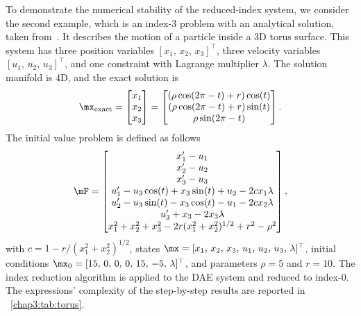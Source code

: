 To demonstrate the numerical stability of the reduced-index system, we consider the second example, which is an index-3 problem with an analytical solution, taken from~\cite{campbell1995constraint}. It describes the motion of a particle inside a 3D torus surface. This system has three position variables $[x_{1}, \, x_{2}, \, x_{3}]^\top$, three velocity variables $[u_{1}, \, u_{2}, \, u_{3}]^\top$, and one constraint with Lagrange multiplier $\lambda$. The solution manifold is 4D, and the exact solution is
%
\begin{equation}
  \label{chap3:eq:torus_solution}
  \mx_\text{exact} = \begin{bmatrix}
    x_{1} \\ x_{2} \\ x_{3}
  \end{bmatrix} = \begin{bmatrix}
    (\rho \cos(2\pi - t) + r) \cos(t) \\
    (\rho \cos(2\pi - t) + r) \sin(t) \\
    \rho \sin(2\pi - t)
  \end{bmatrix}.
\end{equation}
%
The initial value problem is defined as follows
%
\begin{equation}
  \label{chap3:eq:torus}
  \mF = \begin{bmatrix}
    x^{\prime}_{1} - u_{1} \\
    x^{\prime}_{2} - u_{2} \\
    x^{\prime}_{3} - u_{3} \\
    u^{\prime}_{1} - u_{3}\cos(t) + x_{3}\sin(t) + u_{2} - 2 c x_{1}\lambda \\
    u^{\prime}_{2} - u_{3}\sin(t) - x_{3}\cos(t) - u_{1} - 2 c x_{2}\lambda \\
    u^{\prime}_{3} + x_{3} - 2x_{3}\lambda \\
    x_{1}^2 + x_{2}^2 + x_{3}^2 - 2r(x_{1}^2 + x_{2}^2)^{1/2} + r^2 - \rho^2
  \end{bmatrix},
\end{equation}
%
with $c = 1 - {r} / {(x_{1}^2 + x_{2}^2)^{1/2}}$, states $\mx = [x_{1}, \, x_{2}, \, x_{3}, \, u_{1}, \, u_{2}, \, u_{3}, \, \lambda]^{\top}$, initial conditions $\mx_{0} = [15, \, 0, \, 0, \, 0, \, 15, \, -5, \, \lambda]^{\top}$, and parameters $\rho = 5$ and $r = 10$. The index reduction algorithm is applied to the \ac{DAE} system and reduced to index-0. The expressions' complexity of the step-by-step results are reported in \tablename{}~\ref{chap3:tab:torus}.

